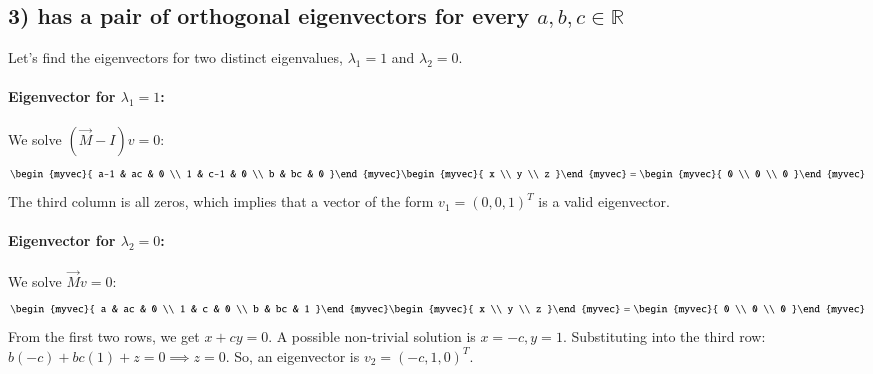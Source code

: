 \documentclass[journal]{IEEEtran}
\begin{document}
\subsection*{3)  has a pair of orthogonal eigenvectors for every $a,b,c \in \mathbb{R}$}
Let's find the eigenvectors for two distinct eigenvalues, $\lambda_1=1$ and $\lambda_2=0$.
\paragraph{Eigenvector for $\lambda_1 = 1$:} We solve $(\vec{M}-I)v = 0$:
\begin{align} \begin{myvec}{ a-1 & ac & 0 \\ 1 & c-1 & 0 \\ b & bc & 0 }\end{myvec} \begin{myvec}{ x \\ y \\ z }\end{myvec} = \begin{myvec}{ 0 \\ 0 \\ 0 }\end{myvec} 
\end{align}
The third column is all zeros, which implies that a vector of the form $v_1 = (0, 0, 1)^T$ is a valid eigenvector.

\paragraph{Eigenvector for $\lambda_2 = 0$:} We solve $\vec{M}v=0$:
\begin{align} 
\begin{myvec}{ a & ac & 0 \\ 1 & c & 0 \\ b & bc & 1 }\end{myvec} \begin{myvec}{ x \\ y \\ z }\end{myvec} = \begin{myvec}{ 0 \\ 0 \\ 0 }\end{myvec} 
\end{align}
From the first two rows, we get $x+cy=0$. A possible non-trivial solution is $x=-c, y=1$. Substituting into the third row: $b(-c) + bc(1) + z = 0 \implies z=0$. So, an eigenvector is $v_2 = (-c, 1, 0)^T$.
\end{document}
